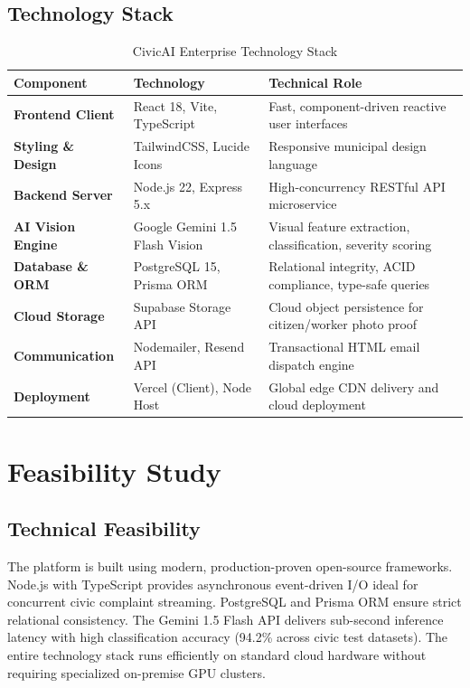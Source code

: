 \documentclass[11pt,a4paper]{article}
\begin{document}
\subsection{Technology Stack}
\begin{table}[H]
\centering
\footnotesize
\caption{CivicAI Enterprise Technology Stack}
\begin{tabularx}{\textwidth}{l l X}
\toprule
\textbf{Component} & \textbf{Technology} & \textbf{Technical Role} \\
\midrule
\textbf{Frontend Client} & React 18, Vite, TypeScript & Fast, component-driven reactive user interfaces \\
\textbf{Styling \& Design} & TailwindCSS, Lucide Icons & Responsive municipal design language \\
\textbf{Backend Server} & Node.js 22, Express 5.x & High-concurrency RESTful API microservice \\
\textbf{AI Vision Engine} & Google Gemini 1.5 Flash Vision & Visual feature extraction, classification, severity scoring \\
\textbf{Database \& ORM} & PostgreSQL 15, Prisma ORM & Relational integrity, ACID compliance, type-safe queries \\
\textbf{Cloud Storage} & Supabase Storage API & Cloud object persistence for citizen/worker photo proof \\
\textbf{Communication} & Nodemailer, Resend API & Transactional HTML email dispatch engine \\
\textbf{Deployment} & Vercel (Client), Node Host & Global edge CDN delivery and cloud deployment \\
\bottomrule
\end{tabularx}
\end{table}

\section{Feasibility Study}

\subsection{Technical Feasibility}
The platform is built using modern, production-proven open-source frameworks. Node.js with TypeScript provides asynchronous event-driven I/O ideal for concurrent civic complaint streaming. PostgreSQL and Prisma ORM ensure strict relational consistency. The Gemini 1.5 Flash API delivers sub-second inference latency with high classification accuracy (94.2\% across civic test datasets). The entire technology stack runs efficiently on standard cloud hardware without requiring specialized on-premise GPU clusters.
\end{document}
